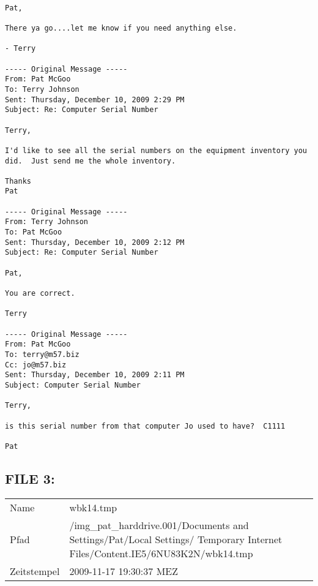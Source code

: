 \begin{lstlisting}

Pat,

There ya go....let me know if you need anything else. 

- Terry

----- Original Message -----
From: Pat McGoo
To: Terry Johnson
Sent: Thursday, December 10, 2009 2:29 PM
Subject: Re: Computer Serial Number

Terry,

I'd like to see all the serial numbers on the equipment inventory you
did.  Just send me the whole inventory.

Thanks
Pat

----- Original Message -----
From: Terry Johnson
To: Pat McGoo
Sent: Thursday, December 10, 2009 2:12 PM
Subject: Re: Computer Serial Number

Pat,

You are correct.

Terry

----- Original Message -----
From: Pat McGoo
To: terry@m57.biz
Cc: jo@m57.biz
Sent: Thursday, December 10, 2009 2:11 PM
Subject: Computer Serial Number

Terry,

is this serial number from that computer Jo used to have?  C1111

Pat
\end{lstlisting}
\newpage
\subsection{FILE 3:}

\begin{table}[htb]
	\begin{tabular}{p{2cm} p{13.5cm}}
		Name & wbk14.tmp\\
		Pfad & /img_pat_harddrive.001/Documents and Settings/Pat/Local Settings/ Temporary Internet Files/Content.IE5/6NU83K2N/wbk14.tmp\\
		Zeitstempel & 2009-11-17 19:30:37 MEZ
	\end{tabular}
\end{table}		

